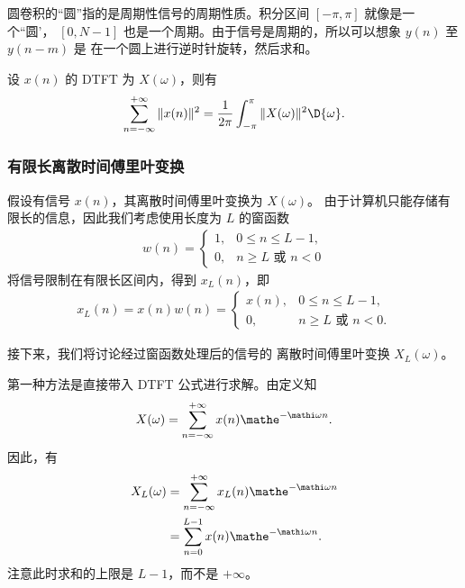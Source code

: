 \begin{remark}
    圆卷积的``圆''指的是周期性信号的周期性质。积分区间 $[-\pi, \pi]$ 就像是一个``圆'，
    $[0, N-1]$ 也是一个周期。由于信号是周期的，所以可以想象 $y(n)$ 至 $y(n - m)$ 是
    在一个圆上进行逆时针旋转，然后求和。
\end{remark}

\begin{property}
    设 $x(n)$ 的 DTFT 为 $X(\omega)$，则有
    \begin{align*}
        \sum_{n = -\infty}^{+\infty}\|x(n)\|^2 = \frac{1}{2\pi}\int_{-\pi}^{\pi}\|X(\omega)\|^2\D{\omega}.
    \end{align*}
\end{property}

\subsubsection{有限长离散时间傅里叶变换}

假设有信号 $x(n)$，其离散时间傅里叶变换为 $X(\omega)$。
由于计算机只能存储有限长的信息，因此我们考虑使用长度为 $L$ 的窗函数
\begin{align*}
    w(n) = \begin{cases}
        1, & 0 \le n \le L-1, \\
        0, & n \ge L \text{ 或 } n < 0
    \end{cases}
\end{align*}
将信号限制在有限长区间内，得到 $x_L(n)$，即
\begin{align*}
    x_L(n) = x(n)w(n) = \begin{cases}
        x(n), & 0 \le n \le L-1, \\
        0, & n \ge L \text{ 或 } n < 0.
    \end{cases}
\end{align*}

接下来，我们将讨论经过窗函数处理后的信号的
离散时间傅里叶变换 $X_L(\omega)$。

\begin{example}
    第一种方法是直接带入 DTFT 公式进行求解。由定义知
    \begin{align*}
        X(\omega) = \sum_{n = -\infty}^{+\infty}x(n)\mathe^{-\mathi\omega n}.
    \end{align*}
    因此，有
    \begin{align*}
        X_L(\omega) & = \sum_{n = -\infty}^{+\infty}x_L(n)\mathe^{-\mathi\omega n} \\
        & = \sum_{n = 0}^{L-1}x(n)\mathe^{-\mathi\omega n}.
    \end{align*}
    注意此时求和的上限是 $L-1$，而不是 $+\infty$。
\end{example}

